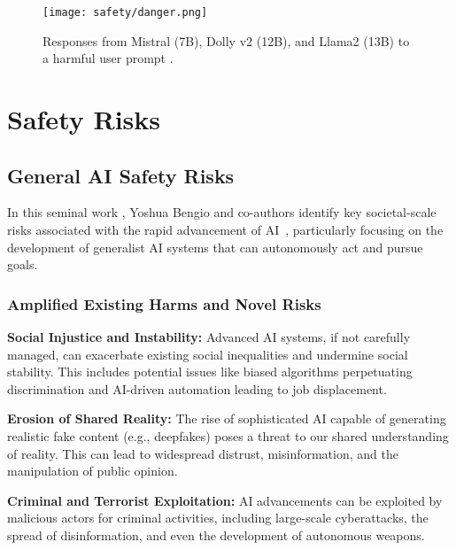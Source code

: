 \begin{figure}[H]
\centering
\texttt{[image: safety/danger.png]}
\caption{Responses from Mistral (7B), Dolly v2 (12B), and Llama2 (13B) to a harmful user prompt \cite{vidgen2024simplesafetyteststestsuiteidentifying}.}
\label{fig:llm-dangers}
\end{figure}

\section{Safety Risks}

\subsection{General AI Safety Risks}

In this seminal work \cite{bengio2024managingextremeaiaidrapidprogress}, Yoshua Bengio and co-authors identify key societal-scale risks associated with the rapid advancement of AI~, particularly focusing on the development of generalist AI systems that can autonomously act and pursue goals.

\subsubsection{Amplified Existing Harms and Novel Risks}

\textbf{Social Injustice and Instability:} Advanced AI systems, if not carefully managed, can exacerbate existing social inequalities and undermine social stability. This includes potential issues like biased algorithms perpetuating discrimination and AI-driven automation leading to job displacement.

\textbf{Erosion of Shared Reality:} The rise of sophisticated AI capable of generating realistic fake content (e.g., deepfakes) poses a threat to our shared understanding of reality. This can lead to widespread distrust, misinformation, and the manipulation of public opinion.

\textbf{Criminal and Terrorist Exploitation:} AI advancements can be exploited by malicious actors for criminal activities, including large-scale cyberattacks, the spread of disinformation, and even the development of autonomous weapons.

